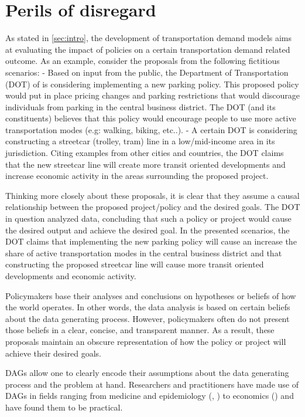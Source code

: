 \section{Perils of disregard}
\label{sec:graph-importance}

As stated in \ref{sec:intro}, the development of transportation demand models aims at evaluating the impact of policies on a certain
transportation demand related outcome. As an example, consider the proposals from the following fictitious scenarios: 
- Based on input from the public, the Department of Transportation (DOT) of  is considering implementing a new parking policy. 
This proposed policy would put in place pricing changes and parking restrictions that would discourage individuals from parking in the central business district. 
The DOT (and its constituents) believes that this policy would encourage people to use more active transportation modes (e.g: walking, biking, etc..).
- A certain DOT is considering constructing a streetcar (trolley, tram) line in a low/mid-income area in its jurisdiction.
Citing examples from other cities and countries, the DOT claims that the new streetcar line will create more transit oriented
developments and increase economic activity in the areas surrounding the proposed project. 


Thinking more closely about these proposals, it is clear that they assume a causal relationship between the proposed project/policy and the desired goals. 
The DOT in question analyzed data, concluding that such a policy or project would cause the desired output and achieve the desired goal.
In the presented scenarios, the DOT claims that implementing the new parking policy will cause an increase the share of 
active transportation modes in the central business district and that constructing the proposed streetcar line will 
cause more transit oriented developments and economic activity.

Policymakers base their analyses and conclusions on hypotheses or beliefs of how the world operates.
In other words, the data analysis is based on certain beliefs about the data generating process.
However, policymakers often do not present those beliefs in a clear, concise, and transparent manner.
As a result, these proposals maintain an obscure representation of how the policy or project will achieve their desired goals. 

DAGs allow one to clearly encode their assumptions about the data generating process and the problem at hand.
Researchers and practitioners have made use of DAGs in fields ranging from medicine and epidemiology (\citet{shrier_platt_2008}, \citet{sung_2011}) to economics (\citet{white2011causal}) and have found them to be practical.

